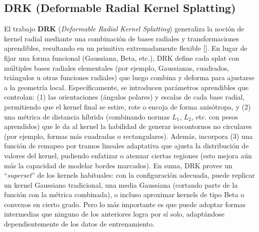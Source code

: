 \subsection{DRK (Deformable Radial Kernel Splatting)}

El trabajo \textbf{DRK} (\textit{Deformable Radial Kernel Splatting}) generaliza la noción de kernel radial mediante una combinación de bases radiales y transformaciones aprendibles, resultando en un primitiva extremadamente flexible [\cite{huang2025deformableradialkernelsplatting}]. En lugar de fijar una forma funcional (Gaussiana, Beta, etc.), DRK define cada splat con múltiples bases radiales elementales (por ejemplo, Gaussianas, cuadrados, triángulos u otras funciones radiales) que luego combina y deforma para ajustarse a la geometría local. Específicamente, se introducen parámetros aprendibles que controlan: (1) las orientaciones (ángulos polares) y escalas de cada base radial, permitiendo que el kernel final se estire, rote o encoja de forma anisótropa, y (2) una métrica de distancia híbrida (combinando normas $L_1$, $L_2$, etc. con pesos aprendidos) que le da al kernel la habilidad de generar isocontornos no circulares (por ejemplo, formas más cuadradas o rectangulares). Además, incorpora (3) una función de remapeo por tramos lineales adaptativa que ajusta la distribución de valores del kernel, pudiendo enfatizar o atenuar ciertas regiones (esto mejora aún más la capacidad de modelar bordes marcados). En suma, DRK provee un “\textit{superset}” de los kernels habituales: con la configuración adecuada, puede replicar un kernel Gaussiano tradicional, una media Gaussiana (cortando parte de la función con la métrica combinada), o incluso aproximar kernels de tipo Beta o convexos en cierto grado. Pero lo más importante es que puede adoptar formas intermedias que ninguno de los anteriores logra por sí solo, adaptándose dependientemente de los datos de entrenamiento.


